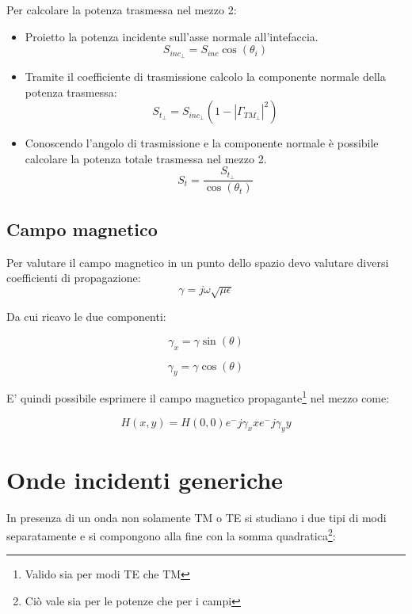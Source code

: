 \documentclass[10pt,a4paper]{report}
\begin{document}
			Per calcolare la potenza trasmessa nel mezzo 2:
			
			\begin{itemize}
			
			\item Proietto la potenza incidente sull'asse normale all'intefaccia.
			\begin{equation}
			S_{inc_\perp}=S_{inc}\cos(\theta_i)
			\end{equation}

			\item Tramite il coefficiente di trasmissione calcolo la componente normale della potenza trasmessa:
			\begin{equation}
			S_{t_\perp}=S_{inc_\perp}(1-|\Gamma_{TM_\perp}|^2)
			\end{equation}

			\item Conoscendo l'angolo di trasmissione e la componente normale è possibile calcolare la potenza totale trasmessa nel mezzo 2.
			\begin{equation}
			S_{t}=\frac{S_{t_\perp}}{\cos(\theta_t)}
			\end{equation}
			

			\end{itemize}
		

		\subsection{Campo magnetico}

			Per valutare il campo magnetico in un punto dello spazio devo valutare diversi coefficienti di propagazione:
			\[
			\gamma=j\omega\sqrt{\mu\epsilon}\]

			Da cui ricavo le due componenti:

			\[
			\gamma_x=\gamma\sin(\theta)
			\]

			\[
			\gamma_y=\gamma\cos(\theta)
			\]

			E' quindi possibile esprimere il campo magnetico propagante\footnote{Valido sia per modi TE che TM} nel mezzo come:
			
			\[
			H(x,y)=H(0,0)e^-{j\gamma_x x}e^-{j\gamma_y y}
			\]
		

		\section{Onde incidenti generiche}

		In presenza di un onda non solamente TM o TE si studiano i due tipi di modi separatamente e si compongono alla fine con la somma quadratica\footnote{Ciò vale sia per le potenze che per i campi}:
\end{document}
